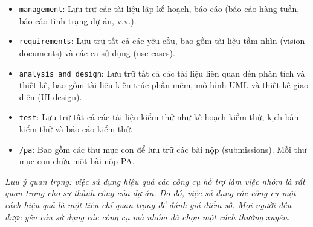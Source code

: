 \begin{itemize}
\begin{itemize}
        \begin{itemize}
            \item \texttt{management}: Lưu trữ các tài liệu lập kế hoạch, báo cáo (báo cáo hàng tuần, báo cáo tình trạng dự án, v.v.).
            \item \texttt{requirements}: Lưu trữ tất cả các yêu cầu, bao gồm tài liệu tầm nhìn (vision documents) và các ca sử dụng (use cases).
            \item \texttt{analysis and design}: Lưu trữ tất cả các tài liệu liên quan đến phân tích và thiết kế, bao gồm tài liệu kiến trúc phần mềm, mô hình UML và thiết kế giao diện (UI design).
            \item \texttt{test}: Lưu trữ tất cả các tài liệu kiểm thử như kế hoạch kiểm thử, kịch bản kiểm thử và báo cáo kiểm thử.
            \item \texttt{/pa}: Bao gồm các thư mục con để lưu trữ các bài nộp (submissions). Mỗi thư mục con chứa một bài nộp PA.
        \end{itemize}
    \end{itemize}
\end{itemize}

\textit{Lưu ý quan trọng: việc sử dụng hiệu quả các công cụ hỗ trợ làm việc nhóm là rất quan trọng cho sự thành công của dự án. Do đó, việc sử dụng các công cụ một cách hiệu quả là một tiêu chí quan trọng để đánh giá điểm số. Mọi người đều được yêu cầu sử dụng các công cụ mà nhóm đã chọn một cách thường xuyên.}
